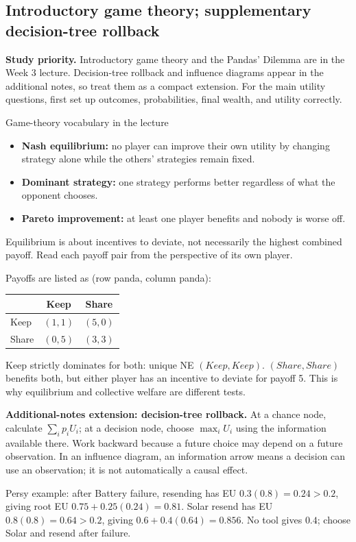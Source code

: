 \documentclass[10pt,a4paper]{article}
\begin{document}
\subsection{Introductory game theory; supplementary decision-tree rollback}
\begin{plain}
\textbf{Study priority.} Introductory game theory and the Pandas' Dilemma are in the Week 3 lecture. Decision-tree rollback and influence diagrams appear in the additional notes, so treat them as a compact extension. For the main utility questions, first set up outcomes, probabilities, final wealth, and utility correctly.
\end{plain}
\begin{card}{Game-theory vocabulary in the lecture}
\begin{itemize}
\item \textbf{Nash equilibrium:} no player can improve their own utility by changing strategy alone while the others' strategies remain fixed.
\item \textbf{Dominant strategy:} one strategy performs better regardless of what the opponent chooses.
\item \textbf{Pareto improvement:} at least one player benefits and nobody is worse off.
\end{itemize}
Equilibrium is about incentives to deviate, not necessarily the highest combined payoff. Read each payoff pair from the perspective of its own player.
\end{card}

\begin{idea}
Payoffs are listed as (row panda, column panda):
\begin{center}
\begin{tabular}{@{}lcc@{}}
\toprule & Keep & Share \\\midrule
Keep & $(1,1)$ & $(5,0)$ \\
Share & $(0,5)$ & $(3,3)$ \\\bottomrule
\end{tabular}
\end{center}
Keep strictly dominates for both: unique NE $(Keep,Keep)$. $(Share,Share)$ benefits both, but either player has an incentive to deviate for payoff 5. This is why equilibrium and collective welfare are different tests.
\end{idea}

\begin{plain}
\textbf{Additional-notes extension: decision-tree rollback.} At a chance node, calculate $\sum_i p_iU_i$; at a decision node, choose $\max_iU_i$ using the information available there. Work backward because a future choice may depend on a future observation. In an influence diagram, an information arrow means a decision can use an observation; it is not automatically a causal effect.

Persy example: after Battery failure, resending has EU $0.3(0.8)=0.24>0.2$, giving root EU $0.75+0.25(0.24)=0.81$. Solar resend has EU $0.8(0.8)=0.64>0.2$, giving $0.6+0.4(0.64)=0.856$. No tool gives $0.4$; choose Solar and resend after failure.
\end{plain}
\end{document}
